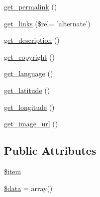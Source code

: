 \begin{DoxyCompactItemize}
\item 
\hyperlink{class_simple_pie___source_a867869e461e00790622bb02ff508332e}{get\-\_\-permalink} ()
\item 
\hyperlink{class_simple_pie___source_a216ae29189a9112fec81f06541fe7f81}{get\-\_\-links} (\$rel= 'alternate')
\item 
\hyperlink{class_simple_pie___source_af497412612dd61ec3133d89d0849c2f0}{get\-\_\-description} ()
\item 
\hyperlink{class_simple_pie___source_abadccb2f1ddb5f2a2738488b5490d2cd}{get\-\_\-copyright} ()
\item 
\hyperlink{class_simple_pie___source_ac89daf0a0eb845cdd47e9c1ff3beaa9a}{get\-\_\-language} ()
\item 
\hyperlink{class_simple_pie___source_aa8132e51caf198b2d05e19cd11c1fb41}{get\-\_\-latitude} ()
\item 
\hyperlink{class_simple_pie___source_a5a7366e692796983b094bfa0a472c3e1}{get\-\_\-longitude} ()
\item 
\hyperlink{class_simple_pie___source_af49a2d7cd8ac95647f1b6ec3e6f22c75}{get\-\_\-image\-\_\-url} ()
\end{DoxyCompactItemize}
\subsection*{Public Attributes}
\begin{DoxyCompactItemize}
\item 
\hyperlink{class_simple_pie___source_a86be993d9c2979790f98ecf2bd8cbd0e}{\$item}
\item 
\hyperlink{class_simple_pie___source_af82618a26bf5e1c89081142a7f1e83a3}{\$data} = array()
\end{DoxyCompactItemize}


